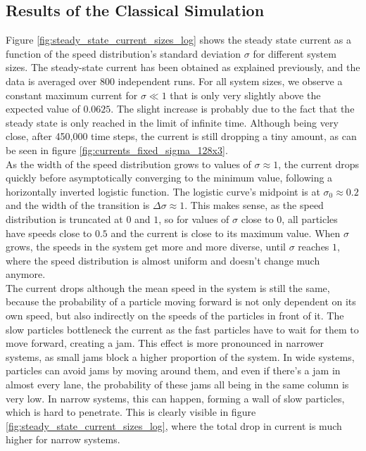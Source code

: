 \subsection{Results of the Classical Simulation}
\label{sec:results_simulation_current_sigma_size}
Figure \ref{fig:steady_state_current_sizes_log} shows the steady state current as a function of the speed distribution's standard deviation $\sigma$ for different system sizes. The steady-state current has been obtained as explained previously, and the data is averaged over 800 independent runs. For all system sizes, we observe a constant maximum current for $\sigma \ll 1$ that is only very slightly above the expected value of $0.0625$. The slight increase is probably due to the fact that the steady state is only reached in the limit of infinite time. Although being very close, after 450,000 time steps, the current is still dropping a tiny amount, as can be seen in figure \ref{fig:currents_fixed_sigma_128x3}. 
\\
As the width of the speed distribution grows to values of $\sigma \approx 1$, the current drops quickly before asymptotically converging to the minimum value, following a horizontally inverted logistic function. The logistic curve's midpoint is at $\sigma_0 \approx 0.2$ and the width of the transition is $\Delta \sigma \approx 1$. This makes sense, as the speed distribution is truncated at $0$ and $1$, so for values of $\sigma$ close to $0$, all particles have speeds close to $0.5$ and the current is close to its maximum value. When $\sigma$ grows, the speeds in the system get more and more diverse, until $\sigma$ reaches $1$, where the speed distribution is almost uniform and doesn't change much anymore. 
\\
The current drops although the mean speed in the system is still the same, because the probability of a particle moving forward is not only dependent on its own speed, but also indirectly on the speeds of the particles in front of it. The slow particles bottleneck the current as the fast particles have to wait for them to move forward, creating a jam. This effect is more pronounced in narrower systems, as small jams block a higher proportion of the system. In wide systems, particles can avoid jams by moving around them, and even if there's a jam in almost every lane, the probability of these jams all being in the same column is very low. In narrow systems, this can happen, forming a wall of slow particles, which is hard to penetrate. This is clearly visible in figure \ref{fig:steady_state_current_sizes_log}, where the total drop in current is much higher for narrow systems. 


